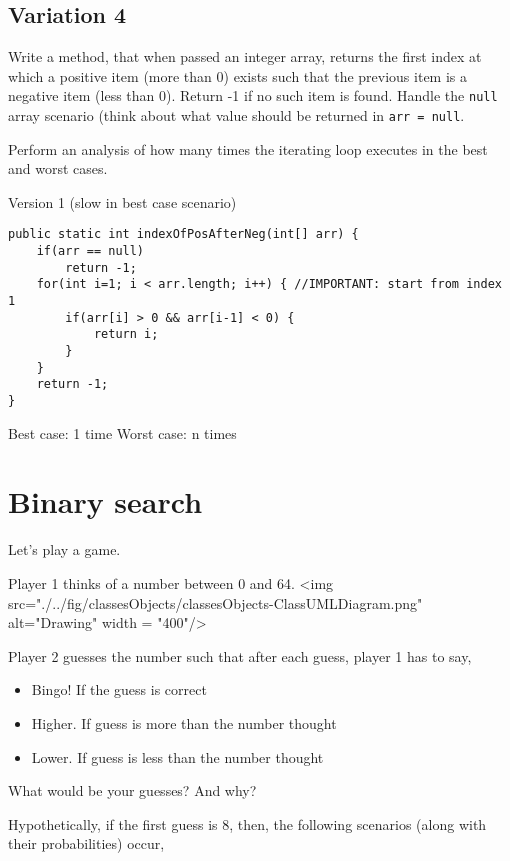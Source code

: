 \subsection{Variation 4}

\begin{exercise}
Write a method, that when passed an integer array, returns the first index at which a positive item (more than 0) exists such that the previous item is a negative item (less than 0). Return -1 if no such item is found. Handle the \texttt{null} array scenario (think about what value should be returned in \texttt{arr = null}.

Perform an analysis of how many times the iterating loop executes in the best and worst cases.
\end{exercise}
\begin{answer}
Version 1 (slow in best case scenario)
\begin{lstlisting}
public static int indexOfPosAfterNeg(int[] arr) {
	if(arr == null)
		return -1;
	for(int i=1; i < arr.length; i++) { //IMPORTANT: start from index 1
		if(arr[i] > 0 && arr[i-1] < 0) {
			return i;
		}
	}
	return -1;
}
\end{lstlisting}	
Best case: 1 time
Worst case: n times
\end{answer}

\section{Binary search}

Let's play a game.

Player 1 thinks of a number between 0 and 64. 
\vskip 1cm
<img src="./../fig/classesObjects/classesObjects-ClassUMLDiagram.png" alt="Drawing" width = "400"/>
\vskip 1cm

Player 2 guesses the number such that after each guess, player 1 has to say,

\begin{itemize}
\item Bingo! If the guess is correct
\item Higher. If guess is more than the number thought	
\item Lower. If guess is less than the number thought	
\end{itemize}

What would be your guesses? And why?

Hypothetically, if the first guess is 8, then, the following scenarios (along with their probabilities) occur,

